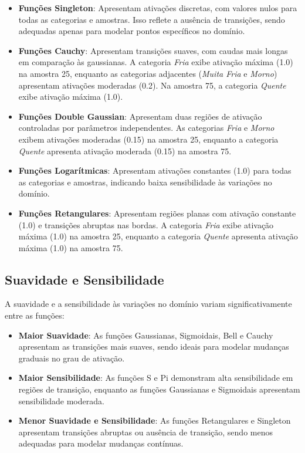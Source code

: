 \documentclass[a4paper,12pt]{article}
\begin{document}
\begin{itemize}
    \item \textbf{Funções Singleton}: Apresentam ativações discretas, com valores nulos para todas as categorias e amostras. Isso reflete a ausência de transições, sendo adequadas apenas para modelar pontos específicos no domínio.

    \item \textbf{Funções Cauchy}: Apresentam transições suaves, com caudas mais longas em comparação às gaussianas. A categoria \textit{Fria} exibe ativação máxima (1.0) na amostra 25, enquanto as categorias adjacentes (\textit{Muita Fria} e \textit{Morno}) apresentam ativações moderadas (0.2). Na amostra 75, a categoria \textit{Quente} exibe ativação máxima (1.0).

    \item \textbf{Funções Double Gaussian}: Apresentam duas regiões de ativação controladas por parâmetros independentes. As categorias \textit{Fria} e \textit{Morno} exibem ativações moderadas (0.15) na amostra 25, enquanto a categoria \textit{Quente} apresenta ativação moderada (0.15) na amostra 75.

    \item \textbf{Funções Logarítmicas}: Apresentam ativações constantes (1.0) para todas as categorias e amostras, indicando baixa sensibilidade às variações no domínio.

    \item \textbf{Funções Retangulares}: Apresentam regiões planas com ativação constante (1.0) e transições abruptas nas bordas. A categoria \textit{Fria} exibe ativação máxima (1.0) na amostra 25, enquanto a categoria \textit{Quente} apresenta ativação máxima (1.0) na amostra 75.
\end{itemize}

\subsection{Suavidade e Sensibilidade}

A suavidade e a sensibilidade às variações no domínio variam significativamente entre as funções:

\begin{itemize}
    \item \textbf{Maior Suavidade}: As funções Gaussianas, Sigmoidais, Bell e Cauchy apresentam as transições mais suaves, sendo ideais para modelar mudanças graduais no grau de ativação.
    \item \textbf{Maior Sensibilidade}: As funções S e Pi demonstram alta sensibilidade em regiões de transição, enquanto as funções Gaussianas e Sigmoidais apresentam sensibilidade moderada.
    \item \textbf{Menor Suavidade e Sensibilidade}: As funções Retangulares e Singleton apresentam transições abruptas ou ausência de transição, sendo menos adequadas para modelar mudanças contínuas.
\end{itemize}
\end{document}
